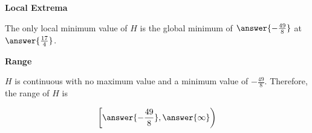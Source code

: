 \documentclass{ximera}
\begin{document}
\begin{exercise}
\begin{question}  \textbf{\textcolor{blue!55!black}{Local Extrema}}

The only local minimum value of $H$ is the global minimum of $\answer{-\frac{49}{8}}$ at $\answer{\frac{17}{4}}$.

\end{question}







\begin{question}  \textbf{\textcolor{blue!55!black}{Range}}

$H$ is continuous with no maximum value and a minimum value of $-\frac{49}{8}$.  Therefore, the range of $H$ is

\[
\left[ \answer{-\frac{49}{8}}, \answer{\infty} \right)
\]

\end{question}


\end{exercise}
\end{document}
